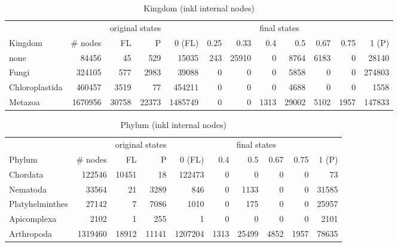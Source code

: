       \begin{table}
        \begin{center}
          \hspace*{-2cm}\begin{tabular}{ |l|r||r|r||r|r|r|r|r|r|r|r| }
            \hline
            & & \multicolumn{2}{c||}{original states} & \multicolumn{8}{c|}{final states} \\
            Kingdom & \# nodes & FL & P
              & 0 (FL) & 0.25 & 0.33 & 0.4 & 0.5 & 0.67 & 0.75 & 1 (P) \\
            \hline \hline
            none & 84456 & 45 & 529 
              & 15035 & 243 & 25910 & 0 & 8764 & 6183 & 0 & 28140 \\
            Fungi & 324105 & 577 & 2983
              & 39088 & 0 & 0 & 0 & 5858 & 0 & 0 & 274803 \\
            Chloroplastida & 460457 & 3519 & 77
              & 454211 & 0 & 0 & 0 & 4688 & 0 & 0 & 1558 \\
            Metazoa & 1670956 & 30758 & 22373
              & 1485749 & 0 & 0 & 1313 & 29002 & 5102 & 1957 & 147833 \\
            \hline  
          \end{tabular}
        \end{center}
        \caption{Kingdom (inkl internal nodes)}
      \end{table}

      \begin{table}
        \begin{center}
          \begin{tabular}{ |l|r||r|r||r|r|r|r|r|r| }
            \hline
            & & \multicolumn{2}{c||}{original states} & \multicolumn{6}{c|}{final states} \\
            Phylum & \# nodes & FL & P
              & 0 (FL) & 0.4 & 0.5 & 0.67 & 0.75 & 1 (P) \\
            \hline \hline
            Chordata & 122546 & 10451 & 18 
              & 122473 & 0 & 0 & 0 & 0 & 73 \\
            Nematoda & 33564 & 21 & 3289 
              & 846 & 0 & 1133 & 0 & 0 & 31585 \\
            Platyhelminthes & 27142 & 7 & 7086 
              & 1010 & 0 & 175 & 0 & 0 & 25957 \\
            Apicomplexa & 2102 & 1 & 255 
              & 1 & 0 & 0 & 0 & 0 & 2101 \\
            \hline
            Arthropoda & 1319460 & 18912 & 11141 
              & 1207204 & 1313 & 25499 & 4852 & 1957 & 78635 \\
            \hline
          \end{tabular}
        \end{center}
        \caption{Phylum (inkl internal nodes)}
      \end{table}

